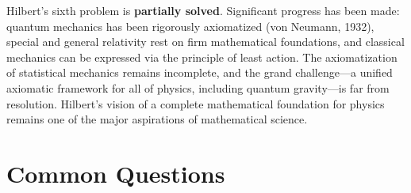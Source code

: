 \begin{partiallybox}
Hilbert's sixth problem is \textbf{partially solved}. Significant progress has been made: quantum mechanics has been rigorously axiomatized (von Neumann, 1932), special and general relativity rest on firm mathematical foundations, and classical mechanics can be expressed via the principle of least action. The axiomatization of statistical mechanics remains incomplete, and the grand challenge---a unified axiomatic framework for all of physics, including quantum gravity---is far from resolution. Hilbert's vision of a complete mathematical foundation for physics remains one of the major aspirations of mathematical science.
\end{partiallybox}

\section*{Common Questions}

